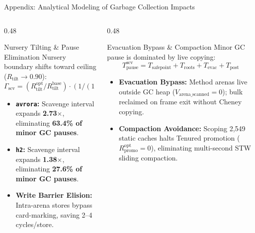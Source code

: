 \documentclass[11pt]{beamer}
\begin{document}
\begin{frame}{Appendix: Analytical Modeling of Garbage Collection Impacts}
  \vspace{-0.3em}
  \begin{columns}[T]
    \begin{column}{0.48\textwidth}
      \begin{block}{Nursery Tilting \& Pause Elimination}
        \scriptsize
        Nursery boundary shifts toward ceiling ($R_{\text{tilt}} \to 0.90$):
        $$\Gamma_{\text{scv}} = (R_{\text{tilt}}^{\text{opt}} / R_{\text{tilt}}^{\text{base}}) \cdot (1 / (1 - \lambda_{\text{arena}}))$$
        \begin{itemize}\setlength{\itemsep}{1.5pt}
          \item \textbf{\texttt{avrora}:} Scavenge interval expands \textbf{2.73$\times$}, eliminating \textbf{63.4\% of minor GC pauses}.
          \item \textbf{\texttt{h2}:} Scavenge interval expands \textbf{1.38$\times$}, eliminating \textbf{27.6\% of minor GC pauses}.
          \item \textbf{Write Barrier Elision:} Intra-arena stores bypass card-marking, saving 2--4 cycles/store.
        \end{itemize}
      \end{block}
    \end{column}

    \begin{column}{0.48\textwidth}
      \begin{block}{Evacuation Bypass \& Compaction}
        \scriptsize
        Minor GC pause is dominated by live copying:
        $$T_{\text{pause}}^{\text{scv}} = T_{\text{safepoint}} + T_{\text{roots}} + T_{\text{evac}} + T_{\text{post}}$$
        \begin{itemize}\setlength{\itemsep}{1.5pt}
          \item \textbf{Evacuation Bypass:} Method arenas live outside GC heap ($V_{\text{arena\_scanned}} = 0$); bulk reclaimed on frame exit without Cheney copying.
          \item \textbf{Compaction Avoidance:} Scoping 2,549 static caches halts Tenured promotion ($R_{\text{promo}}^{\text{opt}} = 0$), eliminating multi-second STW sliding compaction.
        \end{itemize}
      \end{block}
    \end{column}
  \end{columns}
\end{frame}
\end{document}
